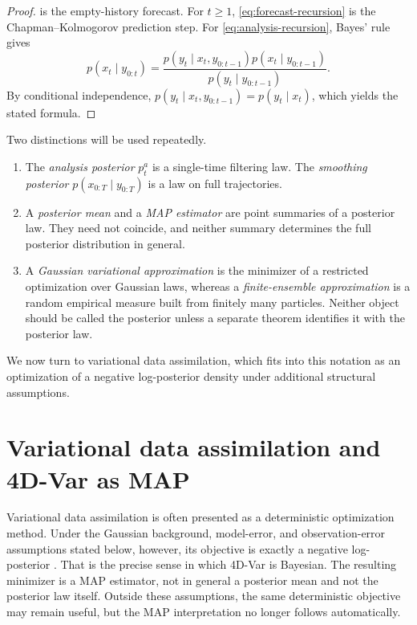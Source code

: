 \documentclass[11pt]{article}
\newcommand{\xtraj}{x_{0:T}}
\newcommand{\ytraj}{y_{0:T}}
\numberwithin{equation}{section}
\theoremstyle{plain}
\theoremstyle{definition}
\theoremstyle{remark}
\begin{document}
\begin{proof}
 is the empty-history forecast. For $t\ge 1$, \cref{eq:forecast-recursion} is the Chapman--Kolmogorov prediction step. For \cref{eq:analysis-recursion}, Bayes' rule gives
\[
p(x_t\mid y_{0:t})
=
\frac{p(y_t\mid x_t,y_{0:t-1})p(x_t\mid y_{0:t-1})}{p(y_t\mid y_{0:t-1})}.
\]
By conditional independence, $p(y_t\mid x_t,y_{0:t-1})=p(y_t\mid x_t)$, which yields the stated formula.
\end{proof}

Two distinctions will be used repeatedly.
\begin{enumerate}[label=\arabic*.]
\item The \emph{analysis posterior} $p_t^a$ is a single-time filtering law. The \emph{smoothing posterior} $p(\xtraj\mid \ytraj)$ is a law on full trajectories.
\item A \emph{posterior mean} and a \emph{MAP estimator} are point summaries of a posterior law. They need not coincide, and neither summary determines the full posterior distribution in general.
\item A \emph{Gaussian variational approximation} is the minimizer of a restricted optimization over Gaussian laws, whereas a \emph{finite-ensemble approximation} is a random empirical measure built from finitely many particles. Neither object should be called the posterior unless a separate theorem identifies it with the posterior law.
\end{enumerate}

We now turn to variational data assimilation, which fits into this notation as an optimization of a negative log-posterior density under additional structural assumptions.

\section{Variational data assimilation and 4D-Var as MAP}
\label{sec:4dvar}

Variational data assimilation is often presented as a deterministic optimization method. Under the Gaussian background, model-error, and observation-error assumptions stated below, however, its objective is exactly a negative log-posterior \citep{lorenc1986,zupanski1997}. That is the precise sense in which 4D-Var is Bayesian. The resulting minimizer is a MAP estimator, not in general a posterior mean and not the posterior law itself. Outside these assumptions, the same deterministic objective may remain useful, but the MAP interpretation no longer follows automatically.
\end{document}
